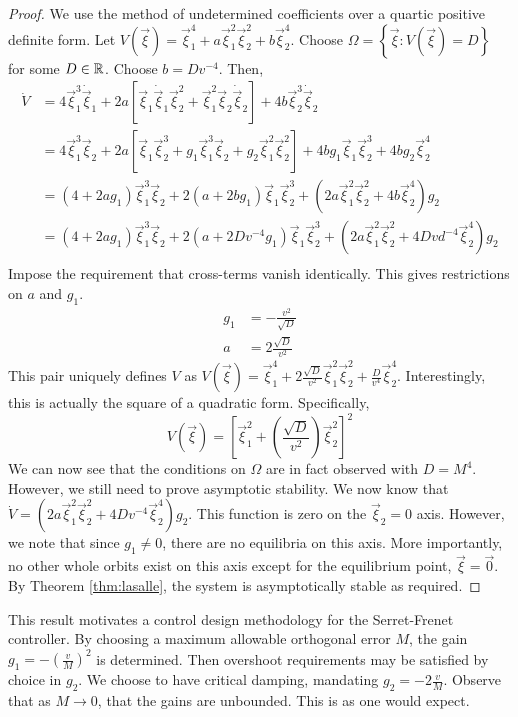 \documentclass[oneside, 11pt]{book}
\begin{document}
\begin{proof}
    We use the method of undetermined coefficients over a quartic positive definite form. Let $V(\vec{\xi}) = \vec{\xi}_1^4 + a\vec{\xi}_1^2\vec{\xi}_2^2 + b\vec{\xi}_2^4$. Choose $\Omega=\left\{\vec{\xi} : V(\vec{\xi}) = D\right\}$ for some $D\in\mathbb{R}$. Choose $b=Dv^{-4}$. Then,
    \begin{align*}
        \dot{V} &=  4\vec{\xi}_1^3\dot{\vec{\xi}}_1 + 2a\left[\vec{\xi}_1\dot{\vec{\xi}}_1\vec{\xi}_2^2 + \vec{\xi}_1^2\vec{\xi}_2\dot{\vec{\xi}}_2\right] + 4b\vec{\xi}_2^3\dot{\vec{\xi}}_2\\
                &=  4\vec{\xi}_1^3\vec{\xi}_2 + 2a\left[\vec{\xi}_1\vec{\xi}_2^3 + g_1\vec{\xi}_1^3\vec{\xi}_2 + g_2\vec{\xi}_1^2\vec{\xi}_2^2\right] + 4bg_1\vec{\xi}_1\vec{\xi}_2^3 + 4bg_2\vec{\xi}_2^4\\
                &=  \left(4+2ag_1\right)\vec{\xi}_1^3\vec{\xi}_2 + 2\left(a + 2bg_1\right)\vec{\xi}_1\vec{\xi}_2^3 + \left(2a\vec{\xi}_1^2\vec{\xi}_2^2 + 4b\vec{\xi}_2^4\right)g_2\\
                &=  \left(4+2ag_1\right)\vec{\xi}_1^3\vec{\xi}_2 + 2\left(a + 2Dv^{-4}g_1\right)\vec{\xi}_1\vec{\xi}_2^3 + \left(2a\vec{\xi}_1^2\vec{\xi}_2^2 + 4Dvd^{-4}\vec{\xi}_2^4\right)g_2\\
    \end{align*}
    Impose the requirement that cross-terms vanish identically. This gives restrictions on $a$ and $g_1$.
    \begin{align*}
        g_1 &= -\frac{v^2}{\sqrt{D}}\\
        a &= 2\frac{\sqrt{D}}{v^2}
    \end{align*}
    This pair uniquely defines $V$ as $V(\vec{\xi}) = \vec{\xi}_1^4 + 2\frac{\sqrt{D}}{v^2}\vec{\xi}_1^2\vec{\xi}_2^2 + \frac{D}{v^4}\vec{\xi}_2^4$. Interestingly, this is actually the square of a quadratic form. Specifically,
    $$
        V(\vec{\xi}) = \left[\vec{\xi}_1^2 + \left(\frac{\sqrt{D}}{v^2}\right)\vec{\xi}_2^2 \right]^2
    $$
    We can now see that the conditions on $\Omega$ are in fact observed with $D = M^4$. However, we still need to prove asymptotic stability. We now know that $\dot{V} = \left(2a\vec{\xi}_1^2\vec{\xi}_2^2 + 4Dv^{-4}\vec{\xi}_2^4\right)g_2$. This function is zero on the $\vec{\xi}_2=0$ axis. However, we note that since $g_1 \neq 0$, there are no equilibria on this axis. More importantly, no other whole orbits exist on this axis except for the equilibrium point, $\vec{\xi}=\vec{0}$. By Theorem \ref{thm:lasalle}, the system is asymptotically stable as required.
\end{proof}
This result motivates a control design methodology for the Serret-Frenet controller. By choosing a maximum allowable orthogonal error $M$, the gain $g_1 = -(\frac{v}{M})^2$ is determined. Then overshoot requirements may be satisfied by choice in $g_2$. We choose to have critical damping, mandating $g_2 = -2\frac{v}{M}$. Observe that as $M\to 0$, that the gains are unbounded. This is as one would expect.
\end{document}
